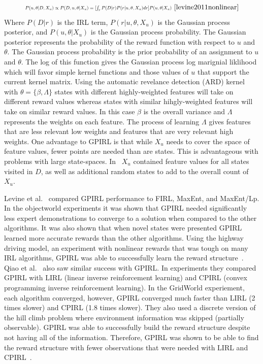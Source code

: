 \documentclass[12pt,american]{report}
\begin{document}
\begin{equation}
            \label{eq:GP_full}
            \resizebox{0.6\textwidth}{!}{$P(u,\theta|D,X_u)\propto P(D,u,\theta|X_u) = [\int_{r}P(D|r)P(r|u,\theta,X_u)dr]P(u,\theta|X_u) $}~\cite{levine2011nonlinear}%
        \end{equation}
Where $P(D|r)$ is the IRL term, $P(r|u,\theta,X_u)$ is the Gaussian process posterior, and $P(u,\theta|X_u)$ is the Gaussian process probability.  The Gaussian posterior represents the probability of the reward function with respect to $u$ and $\theta$. The Gaussian process probability is the prior probability of an assignment to $u$ and $\theta$. The log of this function gives the Gaussian process log marignial liklihood which will favor simple kernel functions and those values of $u$ that support the current kernel matrix.  Using the automatic revelance detection (ARD) kernel with $\theta = \{ \beta,\Lambda \}$ states with different highly-weighted features will take on different reward values whereas states with similar hihgly-weighted features will take on similar reward values. In this case $\beta$ is the overall variance and $\Lambda$ represents the weights on each feature. The process of learning $\Lambda$ gives features that are less relevant low weights and features that are very relevant high weights. One advantage to GPIRL is that while $X_u$ needs to cover the space of feature values, fewer points are needed than are states.  This is advantageous with problems with large state-spaces. In~\cite{levine2011nonlinear} $X_u$ contained feature values for all states visited in $D$, as well as additional random states to add to the overall count of $X_u$. 

Levine et al.~\cite{levine2011nonlinear} compared GPIRL performance to FIRL, MaxEnt, and MaxEnt/Lp. In the objectworld experiments it was shown that GPIRL needed significantly less expert demonstrations to converge to a solution when compared to the other algorithms. It was also shown that when novel states were presented GPIRL learned more accurate rewards than the other algorithms.  Using the highway driving model, an experiment with nonlinear rewards that was tough on many IRL algorithms, GPIRL was able to successfully learn the reward structure~\cite{levine2011nonlinear}. Qiao et al.~\cite{qiao2011inverse} also saw similar success with GPIRL.  In experiments they compared GPIRL with LIRL (linear inverse reinforcement learning) and CPIRL (convex programming inverse reinforcement learning). In the GridWorld experiement, each algorithm converged, however, GPIRL converged much faster than LIRL (2 times slower) and CPIRL (1.8 times slower).  They also used a discrete version of the hill climb problem where  environment information was skipped (partially observable).  GPIRL was able to successfully build the reward structure despite not having all of the information. Therefore, GPIRL was shown to be able to find the reward structure with fewer observations that were needed with LIRL and CPIRL~\cite{qiao2011inverse}.
\end{document}

